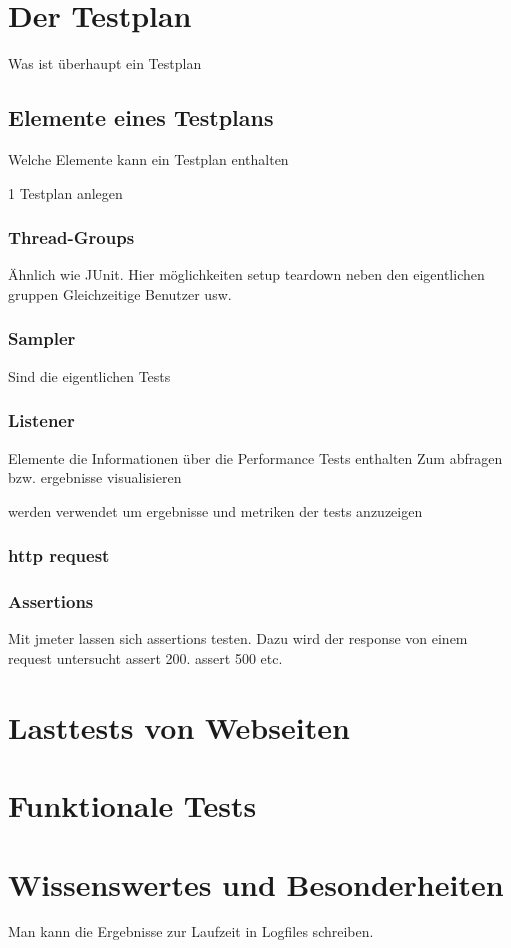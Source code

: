 \documentclass[a4paper,12pt]{article}
\begin{document}
\section{Der Testplan}
Was ist überhaupt ein Testplan
\subsection{Elemente eines Testplans}
Welche Elemente kann ein Testplan enthalten

1 Testplan anlegen
\subsubsection{Thread-Groups}
Ähnlich wie JUnit. Hier möglichkeiten setup teardown neben den eigentlichen gruppen
Gleichzeitige Benutzer usw.
\subsubsection{Sampler}
Sind die eigentlichen Tests
\subsubsection{Listener}
Elemente die Informationen über die Performance Tests enthalten
Zum abfragen bzw. ergebnisse visualisieren

werden verwendet um ergebnisse und metriken der tests anzuzeigen

\subsubsection{http request}
\subsubsection{Assertions}
Mit jmeter lassen sich assertions testen. Dazu wird der response von einem request untersucht assert 200. assert 500 etc.

\section{Lasttests von Webseiten}

\section{Funktionale Tests}

\section{Wissenswertes und Besonderheiten}
Man kann die Ergebnisse zur Laufzeit in Logfiles schreiben.
\end{document}
